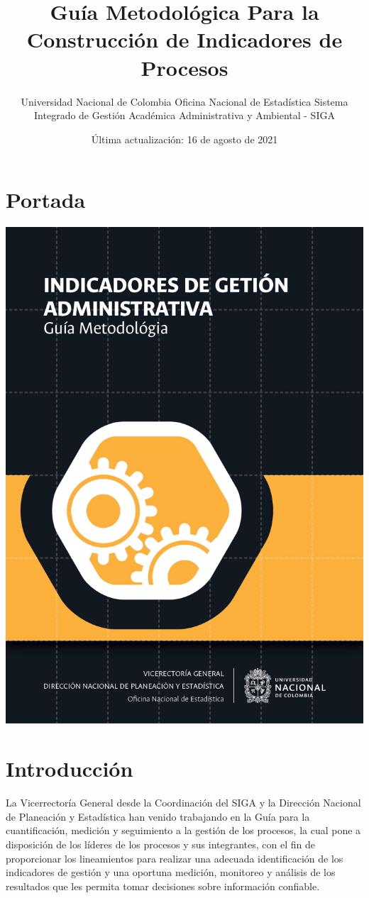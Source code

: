\documentclass[
]{book}
\title{Guía Metodológica Para la Construcción de Indicadores de Procesos}
\author{ Universidad Nacional de Colombia Oficina Nacional de Estadística Sistema Integrado de Gestión Académica Administrativa y Ambiental - SIGA}
\date{Última actualización: 16 de agosto de 2021}
\begin{document}
\maketitle

{
\setcounter{tocdepth}{1}
\tableofcontents
}
\hypertarget{portada}{%
\chapter*{Portada}\label{portada}}

\begin{center}\includegraphics[width=0.75\linewidth]{Imagenes/Portada} \end{center}

\hypertarget{intro}{%
\chapter{Introducción}\label{intro}}

La Vicerrectoría General desde la Coordinación del SIGA y la Dirección Nacional de Planeación y Estadística han
venido trabajando en la Guía para la cuantificación, medición y seguimiento a la gestión de los procesos, la cual pone a disposición de los líderes de los procesos y sus integrantes, con el fin de proporcionar los lineamientos para realizar una adecuada identificación de los indicadores de gestión y una oportuna medición, monitoreo y análisis de los resultados que les permita tomar decisiones sobre información confiable.
\end{document}
